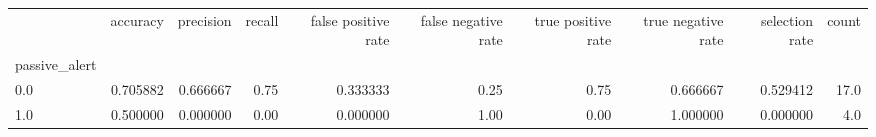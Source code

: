 \begin{tabular}{lrrrrrrrrr}
\toprule
{} &  accuracy &  precision &  recall &  false positive rate &  false negative rate &  true positive rate &  true negative rate &  selection rate &  count \\
passive\_alert &           &            &         &                      &                      &                     &                     &                 &        \\
\midrule
0.0           &  0.705882 &   0.666667 &    0.75 &             0.333333 &                 0.25 &                0.75 &            0.666667 &        0.529412 &   17.0 \\
1.0           &  0.500000 &   0.000000 &    0.00 &             0.000000 &                 1.00 &                0.00 &            1.000000 &        0.000000 &    4.0 \\
\bottomrule
\end{tabular}
